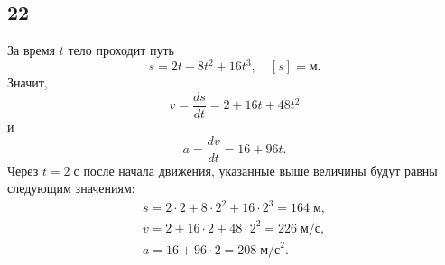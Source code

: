 \subsection{22}

За время $t$ тело проходит путь
\[
s=2t+8t^2+16t^3,\quad[s]=\text{м}.
\]
Значит,
\[
v=\frac{ds}{dt}=2+16t+48t^2
\]
и
\[
a=\frac{dv}{dt}=16+96t.
\]
Через $t=2\;\text{с}$ после начала движения, указанные выше величины будут равны следующим значениям:
\begin{gather*}
s=2\cdot2+8\cdot2^2+16\cdot2^3=164\;\text{м}, \\
v=2+16\cdot2+48\cdot2^2=226\;\text{м/с}, \\
a=16+96\cdot2=208\;\text{м/с}^2.
\end{gather*}